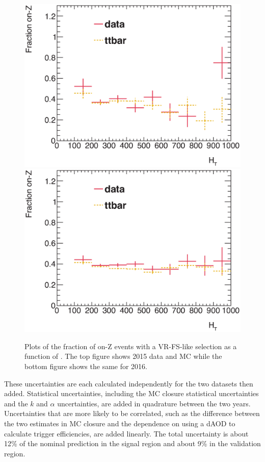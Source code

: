 \begin{centering}
\begin{figure}[bth]
\myfloatalign
\includegraphics[width=.85\linewidth]{figures/fs/frac_vs_ht_2015.eps}
\includegraphics[width=.85\linewidth]{figures/fs/frac_vs_ht_2016.eps}
\caption{Plots of the fraction of on-Z events with a VR-FS-like selection as a function of \HT. The top figure shows 2015 data and \ac{MC} while the bottom figure shows the same for 2016.}
\label{fig:fs_frac_ht}
\end{figure}
\end{centering}

These uncertainties are each calculated independently for the two datasets then added. Statistical uncertainties, including the \ac{MC} closure statistical uncertainties and the $k$ and $\alpha$ uncertainties, are added in quadrature between the two years. Uncertainties that are more likely to be correlated, such as the difference between the two estimates in \ac{MC} closure and the dependence on using a dAOD to calculate trigger efficiencies, are added linearly. The total uncertainty is about 12\% of the nominal prediction in the signal region and about 9\% in the validation region. 

